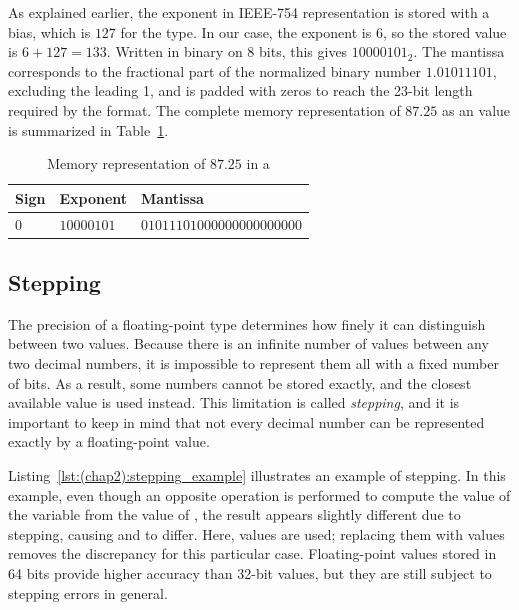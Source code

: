 As explained earlier, the exponent in IEEE-754 representation is
stored with a bias, which is $127$ for the  type. In our case, the
exponent is $6$, so the stored value is $6 + 127 = 133$. Written in binary on 8
bits, this gives $10000101_2$. The mantissa corresponds to the fractional part
of the normalized binary number $1.01011101$, excluding the leading 1, and is
padded with zeros to reach the 23-bit length required by the format. The
complete memory representation of $87.25$ as an  value is summarized
in Table~\ref{tab:(chap2):float_mem_repr_ex}.

\begin{table}[h!]
  \centering
  \begin{tabular}{p{}|p{}|p{}}
    \toprule[0.6pt]
    \textbf{Sign} & \textbf{Exponent} & \textbf{Mantissa} \\
    \toprule[0.6pt]
    $0$    & $10000101$ & $01011101000000000000000$ \\
    \bottomrule[0.2pt]
  \end{tabular}
  \caption{\label{tab:(chap2):float_mem_repr_ex} Memory representation of $87.25$ in a }
\end{table}

\subsection{Stepping}

The precision of a floating-point type determines how finely it can
distinguish between two values. Because there is an infinite number of values
between any two decimal numbers, it is impossible to represent them all with a
fixed number of bits. As a result, some numbers cannot be stored exactly, and
the closest available value is used instead. This limitation is called
\textit{stepping}, and it is important to keep in mind that not every decimal
number can be represented exactly by a floating-point value.


Listing~\ref{lst:(chap2):stepping_example} illustrates an example of
stepping. In this example, even though an opposite operation is performed to
compute the value of the variable  from the value of , the
result appears slightly different due to stepping, causing  and
 to differ. Here,  values are used; replacing them with
 values removes the discrepancy for this particular case.
Floating-point values stored in 64 bits provide higher accuracy than 32-bit
values, but they are still subject to stepping errors in general.

